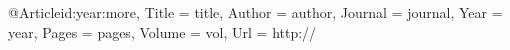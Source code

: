 @Article{id:year:more,
	Title                    = {title},     
  Author                   = {author}, 
	Journal                  = {journal},
	Year                     = {year},
	Pages                    = {pages},
	Volume                   = {vol},
	Url                      = {http://}
}

